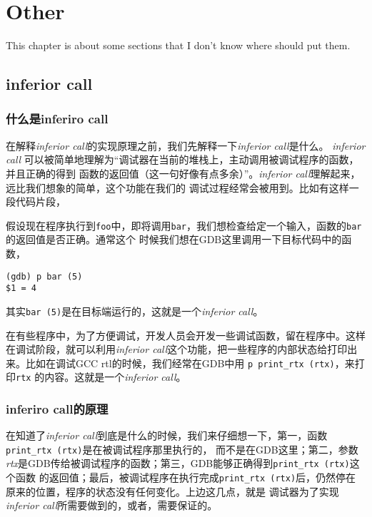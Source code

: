 \chapter{Other}
This chapter is about some sections that I don't know where should put them.

\section{inferior call}

\subsection {什么是inferiro call}
在解释\textit{inferior call}的实现原理之前，我们先解释一下\textit{inferior call}是什么。
\textit{inferior call} 可以被简单地理解为“调试器在当前的堆栈上，主动调用被调试程序的函数，并且正确的得到
函数的返回值（这一句好像有点多余）”。\textit{inferior call}理解起来，远比我们想象的简单，这个功能在我们的
调试过程经常会被用到。比如有这样一段代码片段，



假设现在程序执行到\texttt{foo}中，即将调用\texttt{bar}，我们想检查给定一个输入，函数的\texttt{bar}的返回值是否正确。通常这个
时候我们想在GDB这里调用一下目标代码中的函数，
\begin{verbatim}
(gdb) p bar (5)
$1 = 4
\end{verbatim} 

其实\texttt{bar (5)}是在目标端运行的，这就是一个\textit{inferior call}。

在有些程序中，为了方便调试，开发人员会开发一些调试函数，留在程序中。这样在调试阶段，就可以利用\textit{inferior call}这个功能，把一些程序的内部状态给打印出来。比如在调试GCC rtl的时候，我们经常在GDB中用 \texttt{p print\_rtx (rtx)}，来打印\texttt{rtx}
的内容。这就是一个\textit{inferior call}。

\subsection {inferiro call的原理}
在知道了\textit{inferior call}到底是什么的时候，我们来仔细想一下，第一，函数\texttt{print\_rtx (rtx)}是在被调试程序那里执行的，
而不是在GDB这里；第二，参数\textit{rtx}是GDB传给被调试程序的函数；第三，GDB能够正确得到\texttt{print\_rtx (rtx)}这个函数
的返回值；最后，被调试程序在执行完成\texttt{print\_rtx (rtx)}后，仍然停在原来的位置，程序的状态没有任何变化。上边这几点，就是
调试器为了实现\textit{inferior call}所需要做到的，或者，需要保证的。

